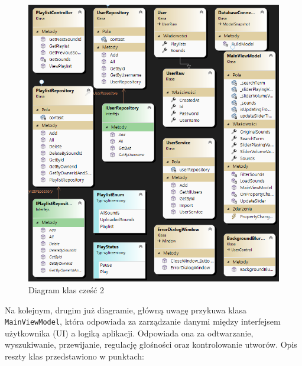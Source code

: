 \begin{figure}[!ht]
	\begin{center}
	\includegraphics[width=500pt]{figures/diagram_czesc2.png}
        \caption{{\footnotesize Diagram klas cześć 2}}
	\end{center}
\end{figure}

\newpage

{Na kolejnym, drugim już diagramie, główną uwagę przykuwa klasa \texttt{MainViewModel}, która odpowiada za zarządzanie danymi między interfejsem użytkownika (UI) a logiką aplikacji. Odpowiada ona za odtwarzanie, wyszukiwanie, przewijanie, regulację głośności oraz kontrolowanie utworów. Opis reszty klas przedstawiono w punktach:}

